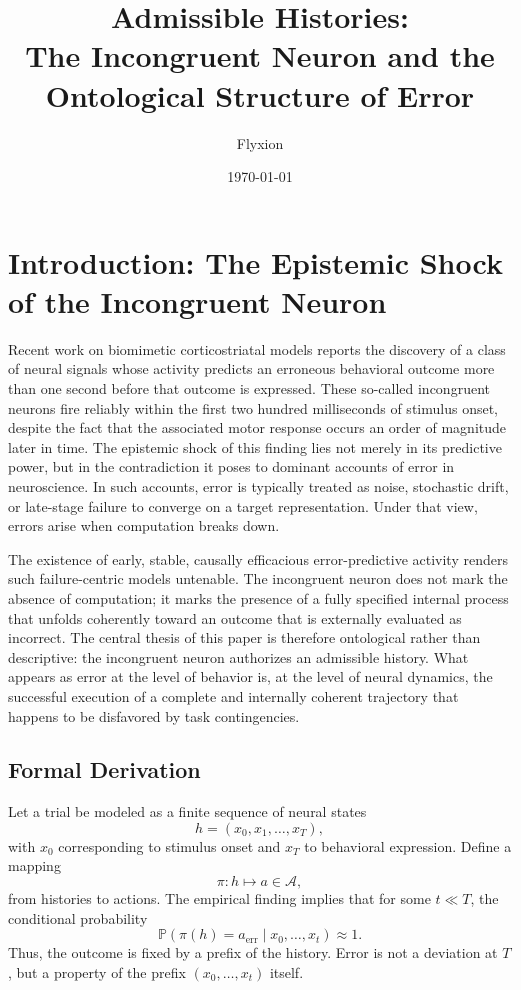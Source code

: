 \documentclass[11pt]{article}
\title{Admissible Histories:\\
The Incongruent Neuron and the Ontological Structure of Error}
\author{Flyxion}
\date{\today}
\theoremstyle{plain}
\theoremstyle{definition}
\begin{document}
\maketitle

\section{Introduction: The Epistemic Shock of the Incongruent Neuron}

Recent work on biomimetic corticostriatal models reports the discovery of a class of neural signals whose activity predicts an erroneous behavioral outcome more than one second before that outcome is expressed. These so-called incongruent neurons fire reliably within the first two hundred milliseconds of stimulus onset, despite the fact that the associated motor response occurs an order of magnitude later in time. The epistemic shock of this finding lies not merely in its predictive power, but in the contradiction it poses to dominant accounts of error in neuroscience. In such accounts, error is typically treated as noise, stochastic drift, or late-stage failure to converge on a target representation. Under that view, errors arise when computation breaks down.

The existence of early, stable, causally efficacious error-predictive activity renders such failure-centric models untenable. The incongruent neuron does not mark the absence of computation; it marks the presence of a fully specified internal process that unfolds coherently toward an outcome that is externally evaluated as incorrect. The central thesis of this paper is therefore ontological rather than descriptive: the incongruent neuron authorizes an admissible history. What appears as error at the level of behavior is, at the level of neural dynamics, the successful execution of a complete and internally coherent trajectory that happens to be disfavored by task contingencies.

\subsection*{Formal Derivation}

Let a trial be modeled as a finite sequence of neural states
\[
h = (x_0, x_1, \dots, x_T),
\]
with $x_0$ corresponding to stimulus onset and $x_T$ to behavioral expression. Define a mapping
\[
\pi : h \mapsto a \in \mathcal{A},
\]
from histories to actions. The empirical finding implies that for some $t \ll T$, the conditional probability
\[
\mathbb{P}(\pi(h)=a_{\mathrm{err}} \mid x_0,\dots,x_t) \approx 1.
\]
Thus, the outcome is fixed by a prefix of the history. Error is not a deviation at $T$, but a property of the prefix $(x_0,\dots,x_t)$ itself.
\end{document}
